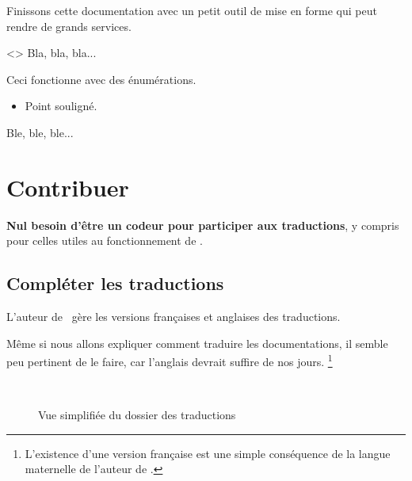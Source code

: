 Finissons cette documentation avec un petit outil de mise en forme qui peut rendre de grands services.


\begin{tdoclatex}<>
Bla, bla, bla...

\tdocsep %

Ceci fonctionne avec des énumérations.

\begin{itemize}
    \item Point souligné.
\end{itemize}

\tdocsep %

Ble, ble, ble...
\end{tdoclatex}


\section{Contribuer}

\begin{tdocnote}
    \textbf{Nul besoin d'être un codeur pour participer aux traductions}, y compris pour celles utiles au fonctionnement de \thisproj.
\end{tdocnote}



\subsection{Compléter les traductions}

\begin{tdocnote}
    L'auteur de \thisproj\ gère les versions françaises et anglaises des traductions.
\end{tdocnote}


\begin{tdoccaut}
    Même si nous allons expliquer comment traduire les documentations, il semble peu pertinent de le faire, car l'anglais devrait suffire de nos jours.%
    \footnote{
        L'existence d'une version française est une simple conséquence de la langue maternelle de l'auteur de \thisproj.
    }
\end{tdoccaut}

\begin{figure}[ht]
    \centering
    \contribtranslatedirtree\
    \caption{Vue simplifiée du dossier des traductions}
    \label{tutodoc-contrib-translate-dir}
\end{figure}


